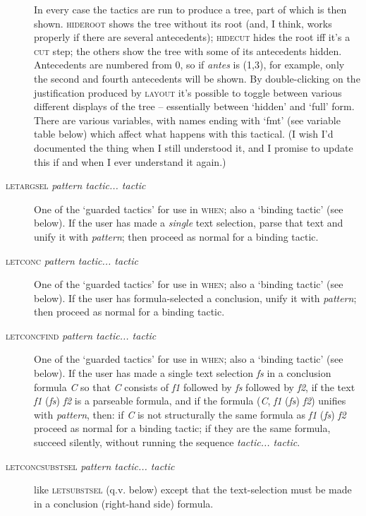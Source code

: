 \begin{description}
In every case the tactics are run to produce a tree, part of which is then shown. \textsc{hideroot} shows the tree without its root (and, I think, works properly if there are several antecedents); \textsc{hidecut} hides the root iff it's a \textsc{cut} step; the others show the tree with some of its antecedents hidden. Antecedents are numbered from 0, so if \textit{antes} is (1,3), for example, only the second and fourth antecedents will be shown. By double-clicking on the justification produced by \textsc{layout} it's possible to toggle between various different displays of the tree -- essentially between `hidden' and `full' form. There are various variables, with names ending with `fmt' (see variable table below) which affect what happens with this tactical. (I wish I'd documented the thing when I still understood it, and I promise to update this if and when I ever understand it again.)

\item [\textsc{letargsel} \textit{pattern tactic... tactic}] One of the `guarded tactics' for use in \textsc{when}; also a `binding tactic' (see below). If the user has made a \textit{single} text selection, parse that text and unify it with \textit{pattern}; then proceed as normal for a binding tactic.

\item [\textsc{letconc} \textit{pattern tactic... tactic}] One of the `guarded tactics' for use in \textsc{when}; also a `binding tactic' (see below). If the user has formula-selected a conclusion, unify it with \textit{pattern}; then proceed as normal for a binding tactic.

\item [\textsc{letconcfind} \textit{pattern tactic... tactic}] One of the `guarded tactics' for use in \textsc{when}; also a `binding tactic' (see below). If the user has made a single text selection \textit{fs} in a conclusion formula \textit{C} so that \textit{C} consists of \textit{f1} followed by \textit{fs} followed by \textit{f2}, if the text \textit{f1} (\textit{fs}) \textit{f2} is a parseable formula, and if the formula (\textit{C}, \textit{f1} (\textit{fs}) \textit{f2}) unifies with \textit{pattern}, then: if \textit{C} is not structurally the same formula as \textit{f1} (\textit{fs}) \textit{f2} proceed as normal for a binding tactic; if they are the same formula, succeed silently, without running the sequence \textit{tactic... tactic}.


\item [\textsc{letconcsubstsel} \textit{pattern tactic... tactic}] like \textsc{letsubstsel} (q.v. below) except that the text-selection must be made in a conclusion (right-hand side) formula.


\end{description}
